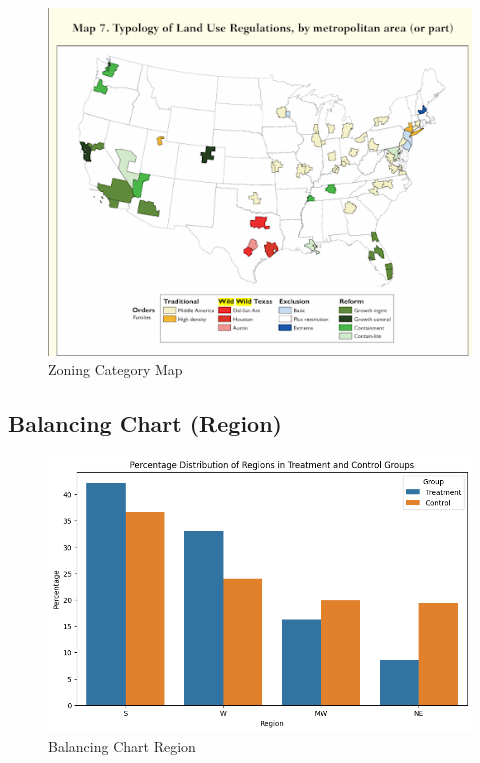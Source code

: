 \documentclass[
  12pt]{article}
\begin{document}
\begin{figure}[H]

{\centering \includegraphics{images/unnamed (1).png}

}

\caption{Zoning Category Map}

\end{figure}%

\subsection{Balancing Chart
(Region)}\label{sec-c.-balancing_chart_region}

\begin{figure}[H]

{\centering \includegraphics{images/clipboard-2848566608.png}

}

\caption{Balancing Chart Region}

\end{figure}%
\end{document}
